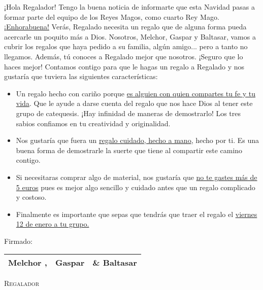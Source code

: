 \documentclass[11pt]{article}
\DeclareRobustCommand{\augiefamily}{%
  \fontfamily{augie}\fontseries{m}\fontshape{n}\selectfont}
\newcommand{\receiver}{Regalado\xspace}
\newcommand{\giver}{Regalador\xspace}
\begin{document}
\bsifamily


¡Hola \giver!
Tengo la buena noticia de informarte que esta Navidad pasas a formar parte del equipo de los Reyes Magos, como cuarto Rey Mago. \ul{¡Enhorabuena!}
Verás, \LARGE{\receiver} \large necesita un regalo que de alguna forma pueda acercarle un poquito más a Dios.
%
Nosotros, Melchor, Gaspar y Baltasar, vamos a cubrir los regalos que haya pedido a su familia, algún amigo... pero a tanto no llegamos. Además, tú conoces a \receiver mejor que nosotros. ¡Seguro que lo haces mejor!
Contamos contigo para que le hagas un regalo a \receiver y nos gustaría que tuviera las siguientes características:
\vspace{-1em}
\begin{itemize}
\item Un regalo hecho con cariño porque \ul{es alguien con quien compartes tu fe y tu vida}. Que le ayude a darse cuenta del regalo que nos hace Dios al tener este grupo de catequesis. ¡Hay infinidad de maneras de demostrarlo! Los tres sabios confiamos en tu creatividad y originalidad.
\item Nos gustaría que fuera un \ul{regalo cuidado, hecho a mano}, hecho por ti. Es una buena forma de demostrarle la suerte que tiene al compartir este camino contigo.
\item Si necesitaras comprar algo de material, nos gustaría que \ul{no te gastes más de 5 euros} pues es mejor algo sencillo y cuidado antes que un regalo complicado y costoso.
\item Finalmente es importante que sepas que tendrás que traer el regalo el \LARGE{\ul{viernes 12 de enero a tu grupo.}}\large
\end{itemize}
Firmado:
\begin{center}
\begin{tabular}{ccc}
\augiefamily Melchor ,& \augiefamily Gaspar & \augiefamily \& Baltasar\\\hline
\end{tabular}
\end{center}


\newpage


\Fontauri\bfseries\slshape


\vspace*{\fill}
\begin{center}
{\fontsize{65}{130}\textsc{\giver}}
\end{center}
\vspace*{\fill}
\end{document}
